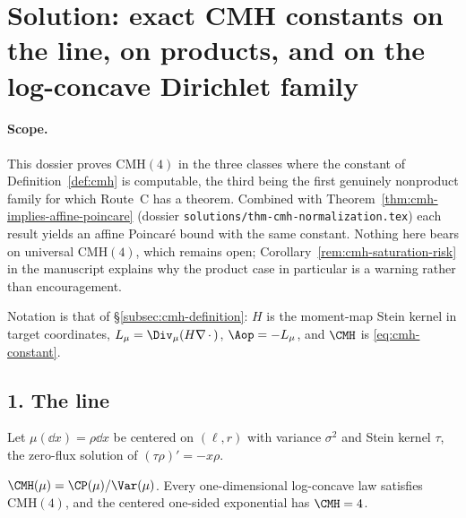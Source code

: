 \documentclass[../main.tex]{subfiles}
\begin{document}
%
\section*{Solution: exact CMH constants on the line, on products,
and on the log-concave Dirichlet family}
\label{sec:sol-cmh-dirichlet}

\paragraph{Scope.}
This dossier proves $\mathrm{CMH}(4)$ in the three classes where the constant of
Definition~\ref{def:cmh} is computable, the third being the first genuinely nonproduct family
for which Route~C has a theorem. Combined with
Theorem~\ref{thm:cmh-implies-affine-poincare} (dossier
\texttt{solutions/thm-cmh-normalization.tex}) each result yields an affine Poincar\'e bound with
the same constant. Nothing here bears on universal $\mathrm{CMH}(4)$, which remains open;
Corollary~\ref{rem:cmh-saturation-risk} in the manuscript explains why the product case in
particular is a warning rather than encouragement.

Notation is that of \S\ref{subsec:cmh-definition}: $H$ is the moment-map Stein kernel in target
coordinates, $L_\mu=\Div_\mu(H\nabla\,\cdot\,)$, $\Aop=-L_\mu$, and $\CMH$ is
\eqref{eq:cmh-constant}.

\subsection*{1. The line}

Let $\mu(\dd x)=\rho\dd x$ be centered on $(\ell,r)$ with variance $\sigma^2$ and Stein kernel
$\tau$, the zero-flux solution of $(\tau\rho)'=-x\rho$.

\begin{theorem}[= Theorem~\ref{thm:cmh-1d}]
\label{thm:sol-cmh-1d}
$\CMH(\mu)=\CP(\mu)/\Var(\mu)$. Every one-dimensional log-concave law satisfies
$\mathrm{CMH}(4)$, and the centered one-sided exponential has $\CMH=4$.
\end{theorem}
\end{document}
